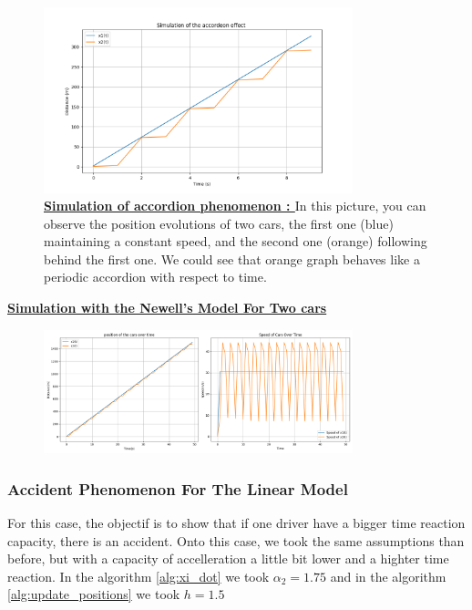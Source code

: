 \documentclass{article}
\begin{document}
			\begin{figure}[H]
				\centering
				\includegraphics[width=0.8\textwidth]{Accordeon1.png}
				\caption[Simulation of accordion phenomenon]{\textbf{\underline{Simulation of accordion phenomenon : }} In this picture, you can observe the position evolutions of two cars, the first one (blue) maintaining a constant speed, and the second one (orange) following behind the first one. We could see that orange graph behaves like a periodic accordion with respect to time.}
				\label{fig:Aco1}
			\end{figure}
			
		\textbf{\underline{Simulation with the Newell's Model For Two cars}} \newline\newline
		
		\begin{figure}[H]
			\centering
			\includegraphics[width=0.8\textwidth]{1W2_Accord.png}
		\end{figure}
			
		\subsubsection{Accident Phenomenon For The Linear Model}
		
		For this case, the objectif is to show that if one driver have a bigger time reaction capacity, there is an accident.
		Onto this case, we took the same assumptions than before, but with a capacity of accelleration a little bit lower and a highter time reaction. In the algorithm \ref{alg:xi_dot} we took $\alpha_2=1.75$ and in the algorithm \ref{alg:update_positions} we took $h=1.5$
		
\end{document}
